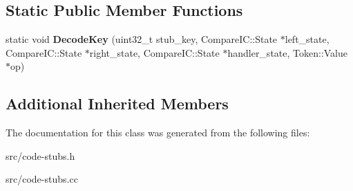 \subsection*{Static Public Member Functions}
\begin{DoxyCompactItemize}
\item 
\hypertarget{classv8_1_1internal_1_1_i_c_compare_stub_ade99143cfa5453ef28799e7f36119f04}{}static void {\bfseries Decode\+Key} (uint32\+\_\+t stub\+\_\+key, Compare\+I\+C\+::\+State $\ast$left\+\_\+state, Compare\+I\+C\+::\+State $\ast$right\+\_\+state, Compare\+I\+C\+::\+State $\ast$handler\+\_\+state, Token\+::\+Value $\ast$op)\label{classv8_1_1internal_1_1_i_c_compare_stub_ade99143cfa5453ef28799e7f36119f04}

\end{DoxyCompactItemize}
\subsection*{Additional Inherited Members}


The documentation for this class was generated from the following files\+:\begin{DoxyCompactItemize}
\item 
src/code-\/stubs.\+h\item 
src/code-\/stubs.\+cc\end{DoxyCompactItemize}
